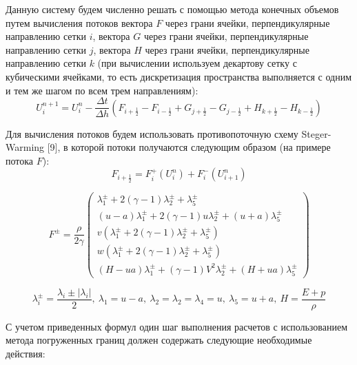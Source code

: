 Данную систему будем численно решать с помощью метода конечных объемов путем вычисления потоков вектора $F$ через грани ячейки, перпендикулярные направлению сетки $i$, вектора $G$ через грани ячейки, перпендикулярные направлению сетки $j$, вектора $H$ через грани ячейки, перпендикулярные направлению сетки $k$ (при вычислении используем декартову сетку с кубическими ячейками, то есть дискретизация пространства выполняется с одним и тем же шагом по всем трем направлениям):
\begin{equation}
	U_i^{n + 1} = U_i^n - \frac{\Delta t}{\Delta h}(F_{i + \frac{1}{2}} - F_{i - \frac{1}{2}} + G_{j + \frac{1}{2}} - G_{j - \frac{1}{2}} + H_{k + \frac{1}{2}} - H_{k - \frac{1}{2}})
\end{equation}

Для вычисления потоков будем использовать противопоточную схему Steger-Warming [9], в которой потоки получаются следующим образом (на примере потока $F$):
\begin{equation}
	F_{i + \frac{1}{2}} = F_i^{+}(U_i^n) + F_i^{-}(U_{i + 1}^n)
\end{equation}

\begin{equation}
	F^{\pm} = \frac{\rho}{2 \gamma}
	\begin{pmatrix}
		\lambda_1^{\pm} + 2(\gamma - 1)\lambda_2^{\pm} + \lambda_5^{\pm} \\
		(u - a)\lambda_1^{\pm} + 2(\gamma - 1)u\lambda_2^{\pm} + (u + a)\lambda_5^{\pm} \\
		v(\lambda_1^{\pm} + 2(\gamma - 1)\lambda_2^{\pm} + \lambda_5^{\pm}) \\
		w(\lambda_1^{\pm} + 2(\gamma - 1)\lambda_2^{\pm} + \lambda_5^{\pm}) \\
		(H - ua)\lambda_1^{\pm} + (\gamma - 1)V^2\lambda_2^{\pm} + (H + ua)\lambda_5^{\pm}
	\end{pmatrix}
\end{equation}

\begin{equation}
	\lambda_i^{\pm} = \frac{\lambda_i \pm |\lambda_i|}{2}, \ \lambda_1 = u - a, \ \lambda_2 = \lambda_2 = \lambda_4 = u, \ \lambda_5 = u + a, \ H = \frac{E + p}{\rho}
\end{equation}

С учетом приведенных формул один шаг выполнения расчетов с использованием метода погруженных границ должен содержать следующие необходимые действия:

